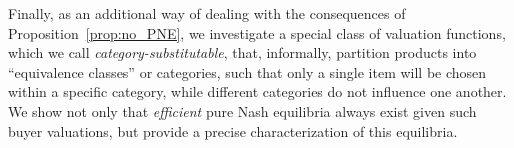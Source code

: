 Finally, as an additional way of dealing with the consequences of
Proposition~\ref {prop:no_PNE}, we investigate a special class of
valuation functions, which we call \emph{category-substitutable},
that, informally, partition products into ``equivalence
classes'' or categories, such that only a single item
will be chosen within a specific category, while 
different categories do not influence one
another. %
We show not only that \emph{efficient} pure Nash equilibria always
exist given such buyer valuations, but provide a
precise characterization of this equilibria.
